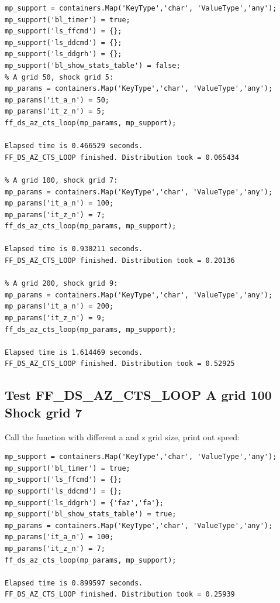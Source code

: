\documentclass[
]{book}
\begin{document}
\begin{verbatim}
mp_support = containers.Map('KeyType','char', 'ValueType','any');
mp_support('bl_timer') = true;
mp_support('ls_ffcmd') = {};
mp_support('ls_ddcmd') = {};
mp_support('ls_ddgrh') = {};
mp_support('bl_show_stats_table') = false;
% A grid 50, shock grid 5:
mp_params = containers.Map('KeyType','char', 'ValueType','any');
mp_params('it_a_n') = 50;
mp_params('it_z_n') = 5;
ff_ds_az_cts_loop(mp_params, mp_support);

Elapsed time is 0.466529 seconds.
FF_DS_AZ_CTS_LOOP finished. Distribution took = 0.065434

% A grid 100, shock grid 7:
mp_params = containers.Map('KeyType','char', 'ValueType','any');
mp_params('it_a_n') = 100;
mp_params('it_z_n') = 7;
ff_ds_az_cts_loop(mp_params, mp_support);

Elapsed time is 0.930211 seconds.
FF_DS_AZ_CTS_LOOP finished. Distribution took = 0.20136

% A grid 200, shock grid 9:
mp_params = containers.Map('KeyType','char', 'ValueType','any');
mp_params('it_a_n') = 200;
mp_params('it_z_n') = 9;
ff_ds_az_cts_loop(mp_params, mp_support);

Elapsed time is 1.614469 seconds.
FF_DS_AZ_CTS_LOOP finished. Distribution took = 0.52925
\end{verbatim}

\hypertarget{test-ff_ds_az_cts_loop-a-grid-100-shock-grid-7}{%
\subsection{Test FF\_DS\_AZ\_CTS\_LOOP A grid 100 Shock grid 7}\label{test-ff_ds_az_cts_loop-a-grid-100-shock-grid-7}}

Call the function with different a and z grid size, print out speed:

\begin{verbatim}
mp_support = containers.Map('KeyType','char', 'ValueType','any');
mp_support('bl_timer') = true;
mp_support('ls_ffcmd') = {};
mp_support('ls_ddcmd') = {};
mp_support('ls_ddgrh') = {'faz','fa'};
mp_support('bl_show_stats_table') = true;
mp_params = containers.Map('KeyType','char', 'ValueType','any');
mp_params('it_a_n') = 100;
mp_params('it_z_n') = 7;
ff_ds_az_cts_loop(mp_params, mp_support);

Elapsed time is 0.899597 seconds.
FF_DS_AZ_CTS_LOOP finished. Distribution took = 0.25939
\end{verbatim}
\end{document}
